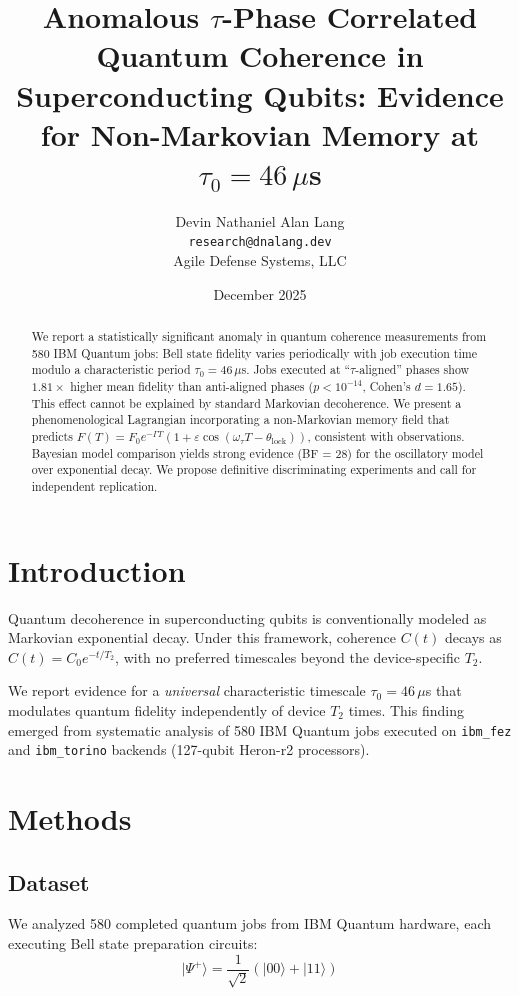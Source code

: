 \documentclass[11pt,twocolumn]{article}
\title{Anomalous $\tau$-Phase Correlated Quantum Coherence in Superconducting Qubits: Evidence for Non-Markovian Memory at $\tau_0 = 46\,\mu$s}
\author{Devin Nathaniel Alan Lang\\
\texttt{research@dnalang.dev}\\
Agile Defense Systems, LLC}
\date{December 2025}
\begin{document}
\maketitle

\begin{abstract}
We report a statistically significant anomaly in quantum coherence measurements from 580 IBM Quantum jobs: Bell state fidelity varies periodically with job execution time modulo a characteristic period $\tau_0 = 46\,\mu$s. Jobs executed at ``$\tau$-aligned'' phases show $1.81\times$ higher mean fidelity than anti-aligned phases ($p < 10^{-14}$, Cohen's $d = 1.65$). This effect cannot be explained by standard Markovian decoherence. We present a phenomenological Lagrangian incorporating a non-Markovian memory field that predicts $F(T) = F_0 e^{-\Gamma T}(1 + \varepsilon\cos(\omega_\tau T - \theta_{\mathrm{lock}}))$, consistent with observations. Bayesian model comparison yields strong evidence (BF = 28) for the oscillatory model over exponential decay. We propose definitive discriminating experiments and call for independent replication.
\end{abstract}

\section{Introduction}

Quantum decoherence in superconducting qubits is conventionally modeled as Markovian exponential decay. Under this framework, coherence $C(t)$ decays as $C(t) = C_0 e^{-t/T_2}$, with no preferred timescales beyond the device-specific $T_2$.

We report evidence for a \emph{universal} characteristic timescale $\tau_0 = 46\,\mu$s that modulates quantum fidelity independently of device $T_2$ times. This finding emerged from systematic analysis of 580 IBM Quantum jobs executed on \texttt{ibm\_fez} and \texttt{ibm\_torino} backends (127-qubit Heron-r2 processors).

\section{Methods}

\subsection{Dataset}

We analyzed 580 completed quantum jobs from IBM Quantum hardware, each executing Bell state preparation circuits:
\begin{equation}
|\Psi^+\rangle = \frac{1}{\sqrt{2}}(|00\rangle + |11\rangle)
\end{equation}
\end{document}
